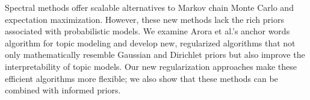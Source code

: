 Spectral methods offer scalable alternatives to Markov chain Monte Carlo and expectation maximization. However, these new methods lack the rich priors associated with probabilistic models. We examine Arora et al.'s anchor words algorithm for topic modeling and develop new, regularized algorithms that not only mathematically resemble Gaussian and Dirichlet priors but also improve the interpretability of topic models. Our new regularization approaches make these efficient algorithms more flexible; we also show that these methods can be combined with informed priors.
